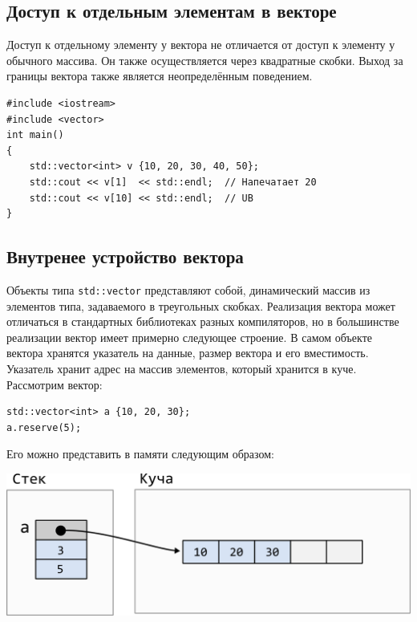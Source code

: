 \documentclass{article}
\begin{document}
\subsection*{Доступ к отдельным элементам в векторе}
Доступ к отдельному элементу у вектора не отличается от доступ к элементу у обычного массива. Он также осуществляется через квадратные скобки. Выход за границы вектора также является неопределённым поведением.
\begin{lstlisting}
#include <iostream>
#include <vector>
int main()
{
    std::vector<int> v {10, 20, 30, 40, 50};
    std::cout << v[1]  << std::endl;  // Напечатает 20
    std::cout << v[10] << std::endl;  // UB
}
\end{lstlisting}


\subsection*{Внутренее устройство вектора}
Объекты типа \texttt{std::vector} представляют собой, динамический массив из элементов типа, задаваемого в треугольных скобках. Реализация вектора может отличаться в стандартных библиотеках разных компиляторов, но в большинстве реализации вектор имеет примерно следующее строение. В самом объекте вектора хранятся указатель на данные, размер вектора и его вместимость. Указатель хранит адрес на массив элементов, который хранится в куче.
Рассмотрим вектор:
\begin{lstlisting}
std::vector<int> a {10, 20, 30};
a.reserve(5);
\end{lstlisting}
Его можно представить в памяти следующим образом:\\

\begin{center}
\includegraphics[scale=1]{../images/vector.png}
\end{center}
\end{document}
